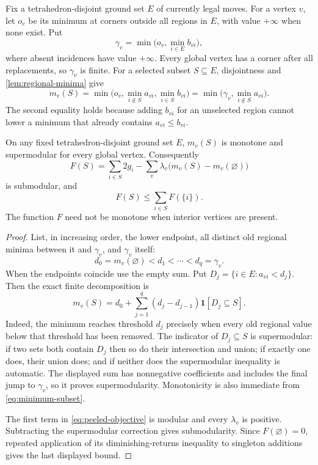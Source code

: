 Fix a tetrahedron-disjoint ground set $E$ of currently legal moves.
For a vertex $v$, let $o_v$ be its minimum at corners outside all
regions in $E$, with value $+\infty$ when none exist. Put
\begin{equation}\label{eq:gamma}
 \gamma_v=\min\bigl(o_v,\min_{i\in E}b_{vi}\bigr),
\end{equation}
where absent incidences have value $+\infty$. Every global vertex has
a corner after all replacements, so $\gamma_v$ is finite. For a
selected subset $S\subseteq E$, disjointness and
\cref{lem:regional-minima} give
\begin{equation}\label{eq:minimum-subset}
 m_v(S)=\min\bigl(o_v,\min_{i\notin S}a_{vi},\min_{i\in S}b_{vi}\bigr)
       =\min\bigl(\gamma_v,\min_{i\notin S}a_{vi}\bigr).
\end{equation}
The second equality holds because adding $b_{vi}$ for an unselected
region cannot lower a minimum that already contains $a_{vi}\le b_{vi}$.

\begin{theorem}
\label{thm:submodular}
On any fixed tetrahedron-disjoint ground set $E$, $m_v(S)$ is monotone
and supermodular for every global vertex. Consequently
\begin{equation}\label{eq:peeled-objective}
 F(S)=\sum_{i\in S}2g_i-
       \sum_v\lambda_v\bigl(m_v(S)-m_v(\varnothing)\bigr)
\end{equation}
is submodular, and
\[
 F(S)\le\sum_{i\in S}F(\{i\}).
\]
The function $F$ need not be monotone when interior vertices are present.
\end{theorem}
\begin{proof}
List, in increasing order, the lower endpoint, all distinct old
regional minima between it and $\gamma_v$, and $\gamma_v$ itself:
\[
 d_0=m_v(\varnothing)<d_1<\cdots<d_q=\gamma_v.
\]
When the endpoints coincide use the empty sum. Put
$D_j=\{i\in E:a_{vi}<d_j\}$. Then the exact finite decomposition is
\[
 m_v(S)=d_0+\sum_{j=1}^{q}(d_j-d_{j-1})
                 \mathbf1[D_j\subseteq S].
\]
Indeed, the minimum reaches threshold $d_j$ precisely when every old
regional value below that threshold has been removed. The indicator
of $D_j\subseteq S$ is supermodular: if two sets both contain $D_j$
then so do their intersection and union; if exactly one does, their
union does; and if neither does the supermodular inequality is automatic.
The displayed sum has nonnegative coefficients and includes the final
jump to $\gamma_v$, so it proves supermodularity.
Monotonicity is also immediate from \eqref{eq:minimum-subset}.

The first term in \eqref{eq:peeled-objective} is modular and every
$\lambda_v$ is positive. Subtracting the supermodular correction gives
submodularity. Since $F(\varnothing)=0$, repeated application of its
diminishing-returns inequality to singleton additions gives the last
displayed bound.
\end{proof}


